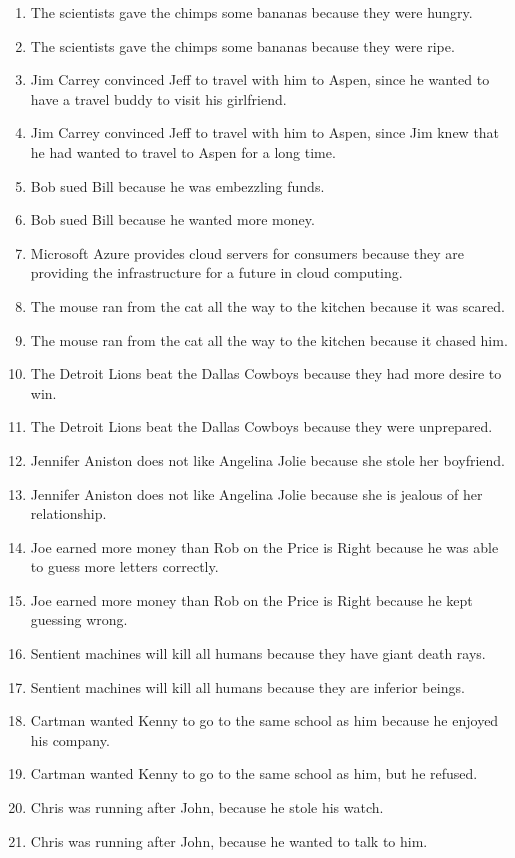 \documentclass{article}
\begin{document}
\begin{enumerate}
	\item The scientists gave the chimps some bananas because they were hungry.
	\item The scientists gave the chimps some bananas because they were ripe.
	\item Jim Carrey convinced Jeff to travel with him to Aspen, since he wanted to have a travel buddy to visit his girlfriend.
	\item Jim Carrey convinced Jeff to travel with him to Aspen, since Jim knew that he had wanted to travel to Aspen for a long time.
	\item Bob sued Bill because he was embezzling funds.
	\item Bob sued Bill because he wanted more money.
	\item Microsoft Azure provides cloud servers for consumers because they are providing the infrastructure for a future in cloud computing.
	\item The mouse ran from the cat all the way to the kitchen because it was scared.
	\item The mouse ran from the cat all the way to the kitchen because it chased him.
	\item The Detroit Lions beat the Dallas Cowboys because they had more desire to win.
	\item The Detroit Lions beat the Dallas Cowboys because they were unprepared.
	\item Jennifer Aniston does not like Angelina Jolie because she stole her boyfriend.
	\item Jennifer Aniston does not like Angelina Jolie because she is jealous of her relationship.
	\item Joe earned more money than Rob on the Price is Right because he was able to guess more letters correctly.
	\item Joe earned more money than Rob on the Price is Right because he kept guessing wrong.
	\item Sentient machines will kill all humans because they have giant death rays.
	\item Sentient machines will kill all humans because they are inferior beings.
	\item Cartman wanted Kenny to go to the same school as him because he enjoyed his company.
	\item Cartman wanted Kenny to go to the same school as him, but he refused.
	\item Chris was running after John, because he stole his watch.
	\item Chris was running after John, because he wanted to talk to him.

\end{enumerate}
\end{document}
